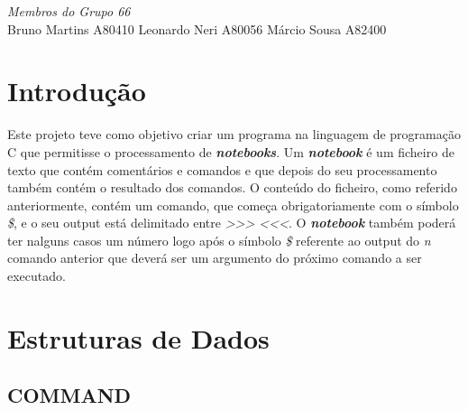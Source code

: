 \begin{titlepage}
\Large \emph{Membros do Grupo 66}\\
Bruno Martins A80410
Leonardo Neri A80056
Márcio Sousa A82400




 

\vfill %

\end{titlepage}

\section{Introdução}
Este projeto teve como objetivo criar um programa na linguagem de programação C que permitisse o processamento de \textbf{\textit{notebooks}}. Um \textbf{\textit{notebook}} é um ficheiro de texto que contém comentários e comandos e que depois do seu processamento também contém o resultado dos comandos.
O conteúdo do ficheiro, como referido anteriormente, contém um comando, que começa obrigatoriamente com o símbolo \textit{\$}, e o seu output está delimitado entre \textit{>>> <<<}. O \textbf{\textit{notebook}} também poderá ter nalguns casos um número logo após o símbolo \textit{\$} referente ao output do \textit{n} comando anterior que deverá ser um argumento do próximo comando a ser executado. 

\section{Estruturas de Dados}



\subsection{COMMAND}

